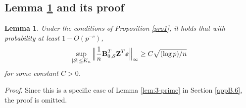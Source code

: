 \documentclass[11pt]{article}
\newtheorem{lemma}{Lemma}%
\newcommand{\be}{\mbox{\bf e}}
\newcommand{\bs}{\mbox{\bf s}}
\newcommand{\bB}{\mbox{\bf B}}
\newcommand{\bI}{\mbox{\bf I}}
\newcommand{\bU}{\mbox{\bf U}}
\newcommand{\bZ}{\mbox{\bf Z}}
\newcommand{\bzero}{\mbox{\bf 0}}
\newcommand{\bveps}{\mbox{\boldmath $\varepsilon$}}
\newcommand{\bOmg}{\mbox{\boldmath $\Omega$}}
\newcommand{\wt}{\widetilde}
\newcommand{\mb}{\mathbb}
\newcommand{\diag}{\mathrm{diag}}
\begin{document}
\subsection{Lemma \ref{lem: 3} and its proof} \label{appB.3}

\begin{lemma}\label{lem: 3}
	Under the conditions of Proposition \ref{pro1}, it holds that with probability at least $1-O(p^{-c})$,
	\[
	\sup_{|\mathcal S| \leq K_n}	\Big\|\frac{1}{n}\bB_{0,\mathcal{S}}^T\bZ^T\bveps\Big\|_{\infty} \geq C\sqrt{(\log p)/n}
	\]
for some constant $C > 0$.
\end{lemma}

\noindent \textit{Proof}. Since this is a specific case of Lemma \ref{lem:3-prime} in Section \ref{appB.6}, the proof is omitted.

\end{document}

